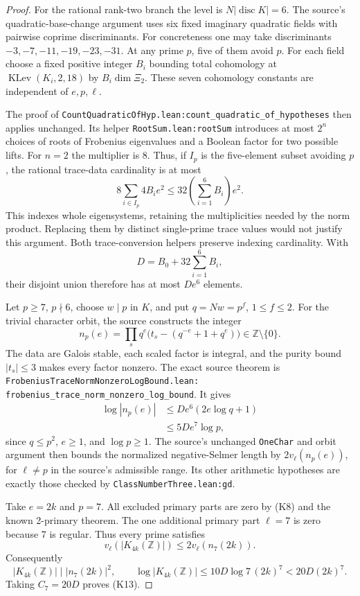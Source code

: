 \begin{proof}
For the rational rank-two branch the level is
\(N|\operatorname{disc}K|=6\).
The source's quadratic-base-change argument uses six fixed
imaginary quadratic fields with pairwise coprime discriminants.
For concreteness one may take discriminants
\(-3,-7,-11,-19,-23,-31\).
At any prime \(p\), five of them avoid \(p\).
For each field choose a fixed positive integer \(B_i\)
bounding total cohomology at
\(\operatorname{KLev}(K_i,2,18)\) by \(B_i\dim\Xi_2\).
These seven cohomology constants are independent of
\(e,p,\ell\).

The proof of
\texttt{CountQuadraticOfHyp.lean:count\_quadratic\_of\_hypotheses}
then applies unchanged. Its helper
\texttt{RootSum.lean:rootSum} introduces at most \(2^n\)
choices of roots of Frobenius eigenvalues and a Boolean
factor for two possible lifts. For \(n=2\) the multiplier
is \(8\). Thus, if \(I_p\) is the five-element subset
avoiding \(p\), the rational trace-data cardinality is at most
\[
 8\sum_{i\in I_p}4B_i e^2
 \le32\left(\sum_{i=1}^6B_i\right)e^2.
\]
This indexes whole eigensystems, retaining the multiplicities
needed by the norm product. Replacing them by distinct
single-prime trace values would not justify this argument.
Both trace-conversion helpers preserve indexing cardinality.
With
\[
 D=B_0+32\sum_{i=1}^6B_i,
\]
their disjoint union therefore has at most \(De^6\) elements.

Let \(p\ge7\), \(p\nmid6\), choose \(w\mid p\) in \(K\), and put
\(q=Nw=p^f\), \(1\le f\le2\). For the trivial character
orbit, the source constructs the integer
\[
 n_p(e)=\prod_{s}
       q^e\bigl(t_s-(q^{-e}+1+q^e)\bigr)
       \in\mathbb Z\setminus\{0\}.                  \tag{K15}
\]
The data are Galois stable, each scaled factor is integral,
and the purity bound \(|t_s|\le3\) makes every factor nonzero.
The exact source theorem is
\texttt{FrobeniusTraceNormNonzeroLogBound.lean:}
\texttt{frobenius\_trace\_norm\_nonzero\_log\_bound}.
It gives
\[
\begin{split}
 \log|n_p(e)|
 &\le De^6(2e\log q+1)\\
 &\le5De^7\log p,
\end{split}
\tag{K16}
\]
since \(q\le p^2\), \(e\ge1\), and \(\log p\ge1\).
The source's unchanged \texttt{OneChar} and orbit argument
then bounds the normalized negative-Selmer length by
\(2v_\ell(n_p(e))\), for \(\ell\ne p\) in the source's
admissible range. Its other arithmetic hypotheses are
exactly those checked by \texttt{ClassNumberThree.lean:gd}.

Take \(e=2k\) and \(p=7\). All excluded primary parts are
zero by (K8) and the known 2-primary theorem.
The one additional primary part \(\ell=7\) is zero because
7 is regular. Thus every prime satisfies
\[
 v_\ell(|K_{4k}(\mathbb Z)|)\le2v_\ell(n_7(2k)).
\]
Consequently
\[
 |K_{4k}(\mathbb Z)|\mid|n_7(2k)|^2,\qquad
 \log|K_{4k}(\mathbb Z)|
 \le10D\log7\,(2k)^7<20D(2k)^7.
\]
Taking \(C_7=20D\) proves (K13).
\end{proof}


